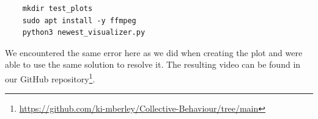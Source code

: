 \begin{verbatim}
    mkdir test_plots
    sudo apt install -y ffmpeg
    python3 newest_visualizer.py
\end{verbatim}

We encountered the same error here as we did when creating the plot and were able to use the same solution to resolve it. The resulting video can be found in our GitHub repository\footnote{\url{https://github.com/ki-mberley/Collective-Behaviour/tree/main}}.
